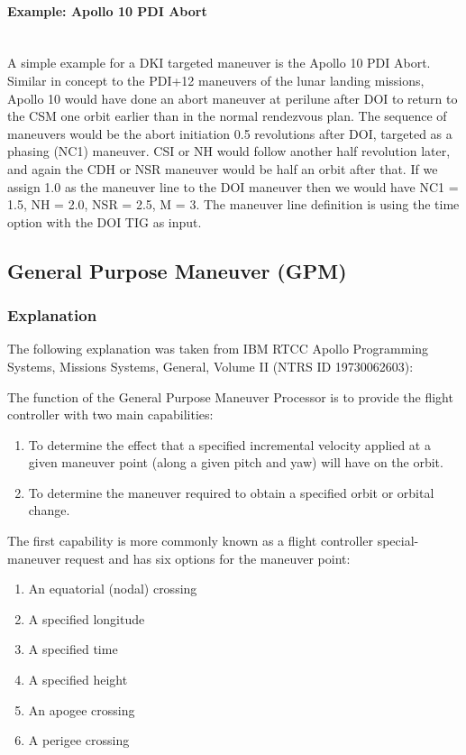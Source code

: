 \documentclass[11pt]{article} %
\begin{document}
\paragraph{Example: Apollo 10 PDI Abort}\mbox{} \\

A simple example for a DKI targeted maneuver is the Apollo 10 PDI Abort. Similar in concept to the PDI+12 maneuvers of the lunar landing missions, Apollo 10 would have done an abort maneuver at perilune after DOI to return to the CSM one orbit earlier than in the normal rendezvous plan. The sequence of maneuvers would be the abort initiation 0.5 revolutions after DOI, targeted as a phasing (NC1) maneuver. CSI or NH would follow another half revolution later, and again the CDH or NSR maneuver would be half an orbit after that. If we assign 1.0 as the maneuver line to the DOI maneuver then we would have NC1 = 1.5, NH = 2.0, NSR = 2.5, M = 3. The maneuver line definition is using the time option with the DOI TIG as input.

\newpage
\subsection{General Purpose Maneuver (GPM)}

\subsubsection{Explanation}

The following explanation was taken from IBM RTCC Apollo Programming Systems, Missions Systems, General, Volume II (NTRS ID 19730062603):

The function of the General Purpose Maneuver Processor is to provide the flight controller with two main capabilities:

\begin{enumerate}
	\item To determine the effect that a specified incremental velocity applied at a given maneuver point (along a given pitch and yaw) will have on the orbit.
	\item To determine the maneuver required to obtain a specified orbit or orbital change.
\end{enumerate}

The first capability is more commonly known as a flight controller special-maneuver request and has six options for the maneuver point:

\begin{enumerate}
	\item An equatorial (nodal) crossing
	\item A specified longitude
	\item A specified time
	\item A specified height
	\item An apogee crossing
	\item A perigee crossing
\end{enumerate}
\end{document}
